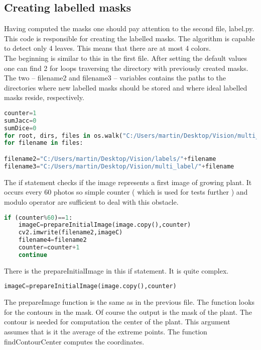 \documentclass[12pt]{article}
\begin{document}
\subsection{Creating labelled masks}

\vspace{5mm}
Having computed the masks one should pay attention to the second file, label.py. This code is responsible for creating the labelled masks. The algorithm is capable to detect only 4 leaves. This means that there are at most 4 colors.\\
The beginning is similar to this in the first file. After setting the default values one can find 2 for loops traversing the directory with previously created masks. The two – filename2 and filename3 – variables contains the paths to the directories where new labelled masks should be stored and where ideal labelled masks reside, respectively. 
\vspace{5mm}
\begin{lstlisting}[language=Python]
counter=1
sumJacc=0
sumDice=0
for root, dirs, files in os.walk("C:/Users/martin/Desktop/Vision/multi_mask"):
for filename in files:

filename2="C:/Users/martin/Desktop/Vision/labels/"+filename
filename3="C:/Users/martin/Desktop/Vision/multi_label/"+filename
\end{lstlisting}
\vspace{5mm}
The if statement checks if the image represents a first image of growing plant. It occurs every 60 photos so simple counter ( which is used for tests further ) and modulo operator are sufficient to deal with this obstacle. 
\vspace{5mm}
\begin{lstlisting}[language=Python]
if (counter%60)==1:
	imageC=prepareInitialImage(image.copy(),counter)
	cv2.imwrite(filename2,imageC)
	filename4=filename2
	counter=counter+1
	continue
\end{lstlisting}
\vspace{5mm}
There is the prepareInitialImage in this if statement. It is quite complex. 
\vspace{5mm}
\begin{lstlisting}[language=Python]
imageC=prepareInitialImage(image.copy(),counter)
\end{lstlisting}
\vspace{5mm}
The prepareImage function is the same as in the previous file. The function looks for the contours in the mask. Of course the output is the mask of the plant. The contour is needed for computation the center of the plant. This argument assumes that is it the average of the extreme points. The function findContourCenter computes the coordinates.
\end{document}
